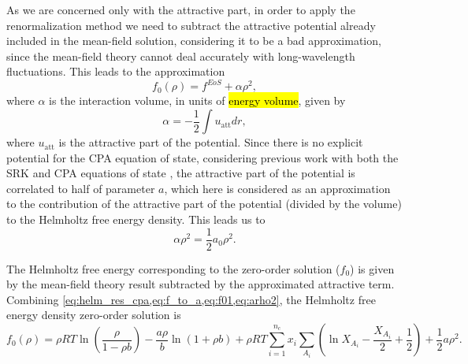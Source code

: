 \documentclass[preprint,12pt,3p]{elsarticle}
\begin{document}
As we are concerned only with the attractive part, in order to apply the renormalization method we need to subtract the attractive potential already included in the mean-field solution, considering it to be a bad approximation, since the mean-field theory cannot deal accurately with long-wavelength fluctuations.
This leads to the approximation
\begin{equation} \label{eq:f01}
f_{0}(\rho) = f^{EoS} + \alpha\rho^2,
\end{equation}
where $\alpha$ is the interaction volume, in units of \hl{energy volume}, given by
\begin{equation} \label{eq:alphav}
\alpha = -\frac{1}{2} \int u_\text{att} dr,
\end{equation}
where $u_\text{att}$ is the attractive part of the potential.
Since there is no explicit potential for the CPA equation of state, considering previous work with both the SRK and CPA equations of state \cite{cai2004thermodynamics, pcm2017application, xu2010crossover}, the attractive part of the potential is correlated to half of parameter $a$, which here is considered as an approximation to the contribution of the attractive part of the potential (divided by the volume) to the Helmholtz free energy density.
This leads us to
\begin{equation} \label{eq:arho2}
\alpha\rho^2 = \frac{1}{2}a_{0}\rho^2.
\end{equation}

The Helmholtz free energy corresponding to the zero-order solution ($f_{0}$) is given by the mean-field theory result subtracted by the approximated attractive term.
Combining \cref{eq:helm_res_cpa,eq:f_to_a,eq:f01,eq:arho2}, the Helmholtz free energy density zero-order solution is
\begin{equation} \label{eq:f00}
f_{0}(\rho) = \rho RT\ln\left(\frac{\rho}{1-\rho b}\right)-\frac{a\rho}{b}\ln(1+\rho b) + \rho RT\sum_{i=1}^{n_c} x_{i} \sum_{A_{i}}\left(\ln X_{A_{i}} - \frac{X_{A_{i}}}{2} + \frac{1}{2}\right) + \frac{1}{2} a\rho^2.
\end{equation}  
\end{document}
